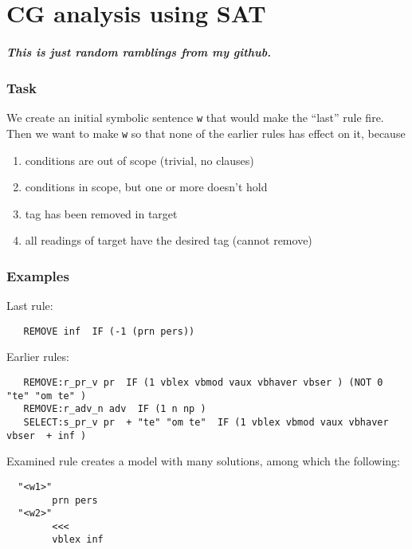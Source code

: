 \chapter{CG analysis using SAT}

\paragraph{This is just random ramblings from my github.}

\subsection{Task}\label{task}

We create an initial symbolic sentence \texttt{w} that would make the
``last'' rule fire. Then we want to make \texttt{w} so that none of the
earlier rules has effect on it, because

\begin{enumerate}
\def\labelenumi{\arabic{enumi}.}
\itemsep1pt\parskip0pt
\item
  conditions are out of scope (trivial, no clauses)
\item
  conditions in scope, but one or more doesn't hold
\item
  tag has been removed in target
\item
  all readings of target have the desired tag (cannot remove)
\end{enumerate}

\subsection{Examples}\label{examples}

Last rule:

\begin{verbatim}
   REMOVE inf  IF (-1 (prn pers))
\end{verbatim}

Earlier rules:

\begin{verbatim}
   REMOVE:r_pr_v pr  IF (1 vblex vbmod vaux vbhaver vbser ) (NOT 0 "te" "om te" )
   REMOVE:r_adv_n adv  IF (1 n np )
   SELECT:s_pr_v pr  + "te" "om te"  IF (1 vblex vbmod vaux vbhaver vbser  + inf )
\end{verbatim}

Examined rule creates a model with many solutions, among which the
following:

\begin{verbatim}
  "<w1>"
        prn pers
  "<w2>"
        <<<
        vblex inf
\end{verbatim}

